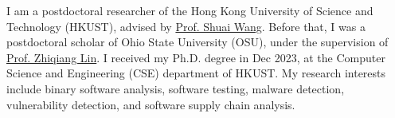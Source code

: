 I am a postdoctoral researcher of the Hong Kong University of Science and Technology (HKUST), advised by \href{https://www.cse.ust.hk/~shuaiw/}{Prof. Shuai Wang}.
Before that, I was a postdoctoral scholar of Ohio State University (OSU), under the supervision of
\href{https://zhiqlin.github.io/}{Prof. Zhiqiang Lin}.
I received my Ph.D. degree in Dec 2023, at the Computer Science and Engineering (CSE) department of HKUST.
My research interests include binary software analysis, software testing, malware detection, vulnerability detection,
and software supply chain analysis.
